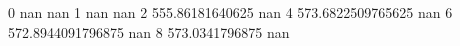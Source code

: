 0 nan nan
1 nan nan
2 555.86181640625 nan
4 573.6822509765625 nan
6 572.8944091796875 nan
8 573.0341796875 nan
